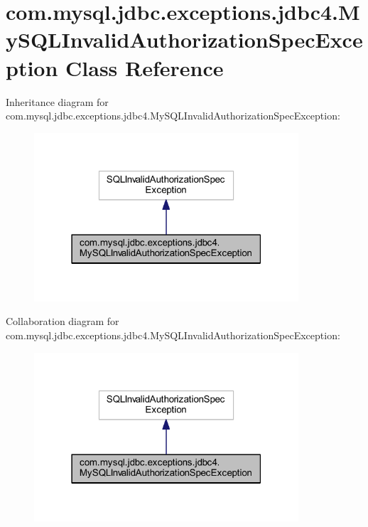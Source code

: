 \hypertarget{classcom_1_1mysql_1_1jdbc_1_1exceptions_1_1jdbc4_1_1_my_s_q_l_invalid_authorization_spec_exception}{}\section{com.\+mysql.\+jdbc.\+exceptions.\+jdbc4.\+My\+S\+Q\+L\+Invalid\+Authorization\+Spec\+Exception Class Reference}
\label{classcom_1_1mysql_1_1jdbc_1_1exceptions_1_1jdbc4_1_1_my_s_q_l_invalid_authorization_spec_exception}


Inheritance diagram for com.\+mysql.\+jdbc.\+exceptions.\+jdbc4.\+My\+S\+Q\+L\+Invalid\+Authorization\+Spec\+Exception\+:
\nopagebreak
\begin{figure}[H]
\begin{center}
\leavevmode
\includegraphics[width=279pt]{classcom_1_1mysql_1_1jdbc_1_1exceptions_1_1jdbc4_1_1_my_s_q_l_invalid_authorization_spec_exception__inherit__graph}
\end{center}
\end{figure}


Collaboration diagram for com.\+mysql.\+jdbc.\+exceptions.\+jdbc4.\+My\+S\+Q\+L\+Invalid\+Authorization\+Spec\+Exception\+:
\nopagebreak
\begin{figure}[H]
\begin{center}
\leavevmode
\includegraphics[width=279pt]{classcom_1_1mysql_1_1jdbc_1_1exceptions_1_1jdbc4_1_1_my_s_q_l_invalid_authorization_spec_exception__coll__graph}
\end{center}
\end{figure}
